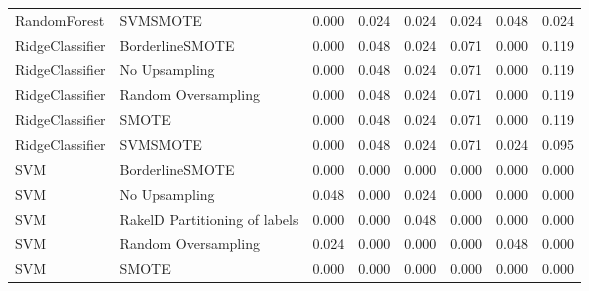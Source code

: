 \begin{tabular}{llllllll}
                   RandomForest &                      SVMSMOTE & 0.000 &                     0.024 &                 0.024 &                  0.024 &                                   0.048 &     0.024 \\
                RidgeClassifier &               BorderlineSMOTE & 0.000 &                     0.048 &                 0.024 &                  0.071 &                                   0.000 &     0.119 \\
                RidgeClassifier &                 No Upsampling & 0.000 &                     0.048 &                 0.024 &                  0.071 &                                   0.000 &     0.119 \\
                RidgeClassifier &           Random Oversampling & 0.000 &                     0.048 &                 0.024 &                  0.071 &                                   0.000 &     0.119 \\
                RidgeClassifier &                         SMOTE & 0.000 &                     0.048 &                 0.024 &                  0.071 &                                   0.000 &     0.119 \\
                RidgeClassifier &                      SVMSMOTE & 0.000 &                     0.048 &                 0.024 &                  0.071 &                                   0.024 &     0.095 \\
                            SVM &               BorderlineSMOTE & 0.000 &                     0.000 &                 0.000 &                  0.000 &                                   0.000 &     0.000 \\
                            SVM &                 No Upsampling & 0.048 &                     0.000 &                 0.024 &                  0.000 &                                   0.000 &     0.000 \\
                            SVM & RakelD Partitioning of labels & 0.000 &                     0.000 &                 0.048 &                  0.000 &                                   0.000 &     0.000 \\
                            SVM &           Random Oversampling & 0.024 &                     0.000 &                 0.000 &                  0.000 &                                   0.048 &     0.000 \\
                            SVM &                         SMOTE & 0.000 &                     0.000 &                 0.000 &                  0.000 &                                   0.000 &     0.000 \\

\end{tabular}
